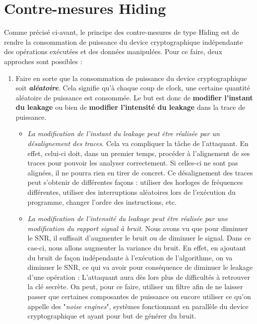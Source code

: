\documentclass[oneside]{book}
\begin{document}
\newpage

\section{Contre-mesures Hiding}
\label{sec:hiding}

\vspace{-0.1 cm}Comme précisé ci-avant, le principe des contre-mesures de type Hiding est de rendre la consommation de puissance du device cryptographique indépendante des opérations exécutées et des données manipulées. Pour ce faire, deux approches sont possibles :
\begin{enumerate}
\item Faire en sorte que la consommation de puissance du device cryptographique soit \textbf{\textit{aléatoire}}. Cela signifie qu'à chaque coup de clock, une certaine quantité aléatoire de puissance est consommée. Le but est donc de \textbf{modifier l'instant du leakage} ou bien de \textbf{modifier l'intensité du leakage} dans la trace de puissance.
\begin{itemize}
\item \textit{La modification de l'instant du leakage peut être réalisée par un désalignement des traces}. Cela va compliquer la tâche de l'attaquant. En effet, celui-ci doit, dans un premier temps, procéder à l'alignement de ses traces pour pouvoir les analyser correctement. Si celles-ci ne sont pas alignées, il ne pourra rien en tirer de concret. Ce désalignement des traces peut s’obtenir de différentes façons : utiliser des horloges de fréquences différentes, utiliser des interruptions aléatoires lors de l’exécution du programme, changer l’ordre des instructions, etc.
\item \textit{La modification de l'intensité du leakage peut être réalisée par une modification du rapport signal à bruit}. Nous avons vu que pour diminuer le SNR, il suffisait d'augmenter le bruit ou de diminuer le signal. Dans ce cas-ci, nous allons augmenter la variance du bruit. En effet, en ajoutant du bruit de façon indépendante à l'exécution de l'algorithme, on va diminuer le SNR, ce qui va avoir pour conséquence de diminuer le leakage d'une opération : L'attaquant aura dès lors plus de difficultés à retrouver la clé secrète. On peut, pour ce faire, utiliser un filtre afin de ne laisser passer que certaines composantes de puissance ou encore utiliser ce qu'on appelle des "\textit{noise engines}", systèmes fonctionnant en parallèle du device cryptographique et ayant pour but de générer du bruit.
\end{itemize}

\end{enumerate}
\end{document}
